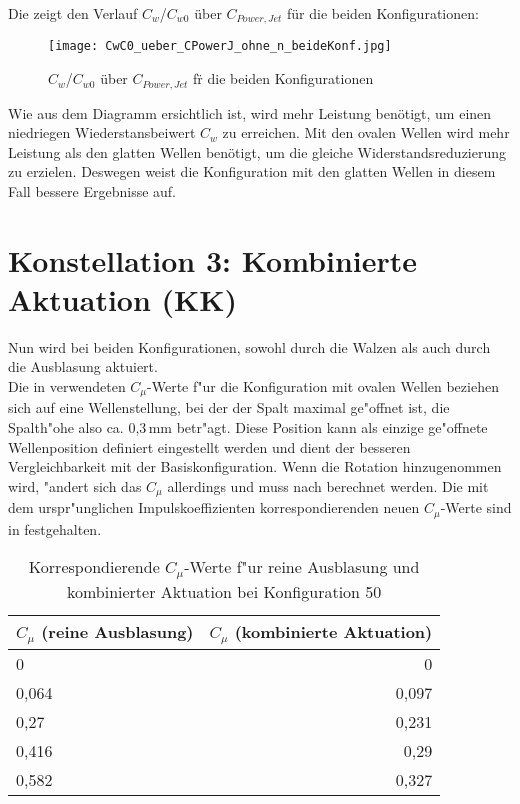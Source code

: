 Die  zeigt den Verlauf $C_{w}$/$C_{w0}$ \"uber $C_{Power,Jet}$  f\"ur die beiden Konfigurationen:
\begin{figure}[h]
	\centering
	\texttt{[image: CwC0\_ueber\_CPowerJ\_ohne\_n\_beideKonf.jpg]}
	\caption{$C_{w}$/$C_{w0}$  \"uber $C_{Power,Jet}$ f\"r die beiden Konfigurationen}
	\label{fig:Cw/Cw0-CpJet_Konf1+2}
\end{figure}

Wie aus dem Diagramm ersichtlich ist, wird mehr Leistung ben\"otigt, um einen niedriegen Wiederstansbeiwert $C_{w}$  zu erreichen. Mit den ovalen Wellen wird mehr Leistung als den glatten Wellen ben\"otigt, um die gleiche Widerstandsreduzierung zu erzielen. Deswegen weist die Konfiguration mit den glatten Wellen in diesem Fall bessere Ergebnisse auf.
\newpage

\section{Konstellation 3: Kombinierte Aktuation (KK)}
\label{s:kombinierteAkt}
Nun wird bei beiden Konfigurationen, sowohl durch die Walzen als auch durch die Ausblasung aktuiert.\\

Die in  verwendeten $C_{\mu}$-Werte f"ur die Konfiguration mit ovalen Wellen beziehen sich auf eine Wellenstellung, bei der der Spalt maximal ge"offnet ist, die Spalth"ohe also ca. 0,3\,mm betr"agt. Diese Position kann als einzige ge"offnete Wellenposition definiert eingestellt werden und dient der besseren Vergleichbarkeit mit der Basiskonfiguration. Wenn die Rotation hinzugenommen wird, "andert sich das $C_{\mu}$ allerdings und muss nach  berechnet werden. Die mit dem urspr"unglichen Impulskoeffizienten korrespondierenden neuen $C_{\mu}$-Werte sind in  festgehalten.

\begin{table}[H]
	\centering
	\begin{tabular}{lr}
		\toprule
		$C_{\mu}$ (reine Ausblasung) & $C_{\mu}$ (kombinierte Aktuation)\\
		\midrule
		0 & 0\\
		0,064 & 0,097\\
		0,27 & 0,231\\
		0,416 & 0,29\\
		0,582 & 0,327\\
		\bottomrule
	\end{tabular}
	\caption{Korrespondierende $C_{\mu}$-Werte f"ur reine Ausblasung und kombinierter Aktuation bei Konfiguration 50}
	\label{tab:Cmu Korrektur}
\end{table}


